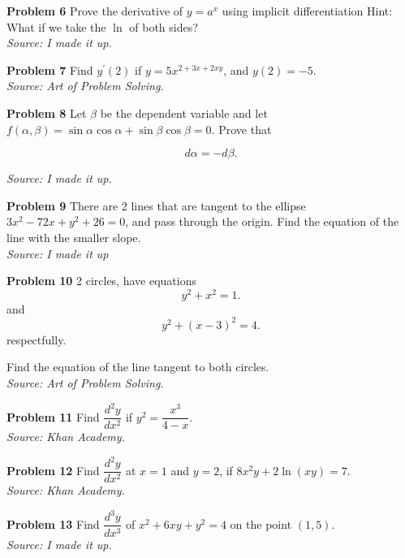 \documentclass{article}
\begin{document}
\vspace{1cm}

\textbf{Problem 6} Prove the derivative of $y = a^x$ using implicit differentiation Hint: What if we take the $\ln$ of both sides?\\
\textit{Source: I made it up.}

\vspace{1cm}

\textbf{Problem 7} Find $y^{\prime} (2)$ if $y = 5x^{2 + 3x + 2xy}$, and $y(2) = -5$.\\
\textit{Source: Art of Problem Solving.}

\vspace{1cm}
\newpage

\textbf{Problem 8} Let $\beta$ be the dependent variable and let $f(\alpha, \beta) = \sin\alpha \cos\alpha + \sin\beta \cos\beta = 0.$ Prove that

\[d\alpha = -d\beta.\]

\textit{Source: I made it up.}

\vspace{1cm}

\textbf{Problem 9} There are 2 lines that are tangent to the ellipse $3x^2 - 72x + y^2 +26 = 0$, and pass through the origin. Find the equation of the line with the smaller slope.\\
\textit{Source: I made it up}

\vspace{1cm}

\textbf{Problem 10} 2 circles, have equations
\[y^2 + x^2 = 1.\]
and
\[y^2 + (x - 3)^2 = 4.\]
respectfully.

Find the equation of the line tangent to both circles.\\
\textit{Source: Art of Problem Solving.}

\vspace{1cm}

\textbf{Problem 11} Find $\dfrac {d^2y} {dx^2}$ if $y^2 = \dfrac {x^3} {4 - x}$.\\
\textit{Source: Khan Academy.}

\vspace{1cm}

\textbf{Problem 12} Find $\dfrac {d^2y} {dx^2}$ at $x = 1$ and $y = 2$, if $8x^2y + 2\ln(xy) = 7$.\\
\textit{Source: Khan Academy.}

\vspace{1cm}

\textbf{Problem 13} Find $\dfrac {d^3y} {dx^3}$ of $x^2 + 6xy + y^2 = 4$ on the point $\left( 1, 5 \right)$.\\
\textit{Source: I made it up.}
\end{document}
